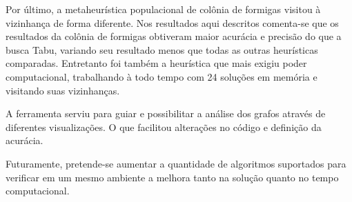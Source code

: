 \documentclass[conference,compsoc]{IEEEtran}
\begin{document}
Por último, a metaheurística populacional de colônia de formigas visitou à vizinhança de forma diferente. Nos resultados aqui descritos comenta-se que os resultados da colônia de formigas obtiveram maior acurácia e precisão do que a busca Tabu, variando seu resultado menos que todas as outras heurísticas comparadas. Entretanto foi também a heurística que mais exigiu poder computacional, trabalhando à todo tempo com 24 soluções em memória e visitando suas vizinhanças.

A ferramenta serviu para guiar e possibilitar a análise dos grafos através de diferentes visualizações. O que facilitou alterações no código e definição da acurácia.

Futuramente, pretende-se aumentar a quantidade de algoritmos suportados para verificar em um mesmo ambiente a melhora tanto na solução quanto no tempo computacional.

\newpage
\newpage
\clearpage
\end{document}
